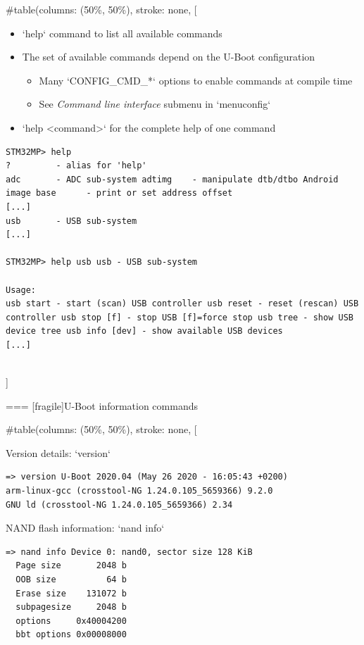#table(columns: (50\%, 50\%), stroke: none,
[
    \begin{itemize}
    \item `help` command to list all available commands
    \item The set of available commands depend on the U-Boot
      configuration
      \begin{itemize}
      \item Many `CONFIG_CMD_*` options to enable commands at
        compile time
      \item See {\em Command line interface} submenu in
        `menuconfig`
      \end{itemize}
    \item `help <command>` for the complete help of one command
    \end{itemize}
    \begin{block}{}
      {\tiny
\begin{verbatim}
STM32MP> help
?         - alias for 'help'
adc       - ADC sub-system adtimg    - manipulate dtb/dtbo Android image base      - print or set address offset
[...]
usb       - USB sub-system
[...]

STM32MP> help usb usb - USB sub-system

Usage:
usb start - start (scan) USB controller usb reset - reset (rescan) USB controller usb stop [f] - stop USB [f]=force stop usb tree - show USB device tree usb info [dev] - show available USB devices
[...]
\end{verbatim}
      }
    \end{block}
  \\]


=== [fragile]{U-Boot information commands}

  
#table(columns: (50\%, 50\%), stroke: none,
[
    \begin{block}{Version details: `version`}
      {\tiny
\begin{verbatim}
=> version U-Boot 2020.04 (May 26 2020 - 16:05:43 +0200)
arm-linux-gcc (crosstool-NG 1.24.0.105_5659366) 9.2.0
GNU ld (crosstool-NG 1.24.0.105_5659366) 2.34
\end{verbatim}
      }
    \end{block}

    \begin{block}{NAND flash information: `nand info`}
      {\tiny
\begin{verbatim}
=> nand info Device 0: nand0, sector size 128 KiB
  Page size       2048 b
  OOB size          64 b
  Erase size    131072 b
  subpagesize     2048 b
  options     0x40004200
  bbt options 0x00008000
\end{verbatim}
      }
    \end{block}

